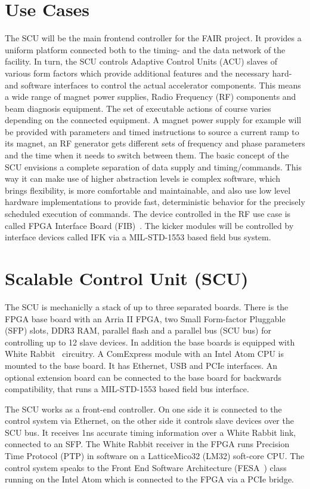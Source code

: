 \documentclass{JAC2003}
\begin{document}
\section{Use Cases}
The SCU will be the main frontend controller for the FAIR project.
It provides a uniform platform connected both to the timing- and the data network of the facility. 
In turn, the SCU controls Adaptive Control Units (ACU) \cite{acuref} slaves of various form factors which provide additional
features and the necessary hard- and software interfaces to control the actual accelerator components.
This means a wide range of magnet power supplies, Radio Frequency (RF) components and beam diagnosis equipment.
The set of executable actions of course varies depending on the connected equipment.
A magnet power supply for example will be provided with parameters and timed instructions to source
a current ramp to its magnet, an RF generator gets different sets of frequency and phase parameters and the time when it needs to switch between them. 
The basic concept of the SCU envisions a complete separation of data supply and timing/commands.
This way it can make use of higher abstraction levels ie complex software, which brings flexibility, is more comfortable and maintainable, and also use low level hardware implementations to provide fast, deterministic behavior for the precisely scheduled execution of commands.
The device controlled in the RF use case is called FPGA Interface Board (FIB)~\cite{fibref}.
The kicker modules will be controlled by interface devices called IFK via a MIL-STD-1553
based field bus system.


\section{Scalable Control Unit (SCU)}
The SCU is mechaniclly a stack of up to three separated boards. There is the FPGA base board
with an Arria II FPGA, two Small Form-factor Pluggable (SFP) slots, DDR3 RAM, parallel flash and a parallel bus (SCU bus) for
controlling up to 12 slave devices. In addition the base boards is equipped with White Rabbit~\cite{wr-ref} circuitry.
A ComExpress module with an Intel Atom CPU is mounted to
the base board. It has Ethernet, USB and PCIe interfaces. An optional extension board can
be connected to the base board for backwards compatibility, that runs a MIL-STD-1553 based
field bus interface.

The SCU works as a front-end controller. On one side it is connected to the control system via Ethernet,
on the other side it controls slave devices over the SCU bus. It receives 1ns accurate timing information over
a White Rabbit link, connected to an SFP. The White Rabbit receiver in the FPGA runs  Precision Time Protocol  (PTP) in software
on a LatticeMico32 (LM32) soft-core CPU. The control system speaks to the Front End Software Architecture (FESA~\cite{fesa-ref}) class running
on the Intel Atom which is connected to the FPGA via a PCIe bridge.
 
\end{document}
